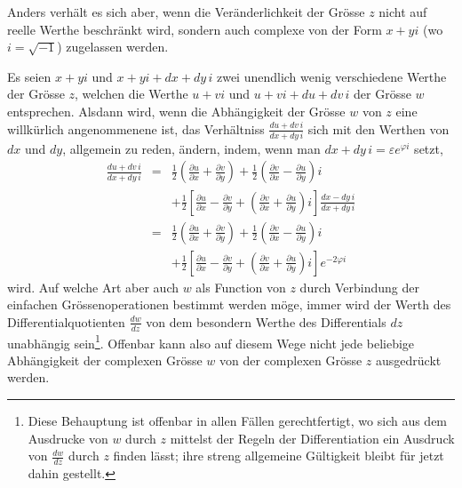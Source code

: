\documentclass[a4paper,12pt]{article}
\begin{document}
Anders verh\"{a}lt es sich aber, wenn die Ver\"{a}nderlichkeit
der Gr\"{o}sse $z$ nicht auf reelle Werthe beschr\"{a}nkt wird,
sondern auch complexe von der Form $x + yi$ (wo $i = \sqrt{-1}$)
zugelassen werden.

Es seien $x + yi$ und $x + yi + dx + dy \, i$ zwei unendlich
wenig verschiedene Werthe der Gr\"{o}sse $z$, welchen die Werthe
$u + vi$ und $u + vi + du + dv \, i$ der Gr\"{o}sse $w$
entsprechen.  Alsdann wird, wenn die Abh\"{a}ngigkeit der
Gr\"{o}sse $w$ von $z$ eine willk\"{u}rlich angenommenene ist,
das Verh\"{a}ltniss
$\displaystyle\frac{du + dv \, i}{dx + dy \, i}$
sich mit den Werthen von $dx$ und $dy$, allgemein zu reden,
\"{a}ndern, indem, wenn man
$dx + dy \, i = \varepsilon e^{\varphi i}$
setzt,
\begin{eqnarray*}
\frac{du + dv \, i}{dx + dy \, i}
   &=&   {\textstyle\frac{1}{2}}
         \left(
            \frac{\partial u}{\partial x}
          + \frac{\partial v}{\partial y}
         \right)
       + {\textstyle\frac{1}{2}}
         \left(
            \frac{\partial v}{\partial x}
          - \frac{\partial u}{\partial y}
         \right) i \\
   & & + {\textstyle\frac{1}{2}}
         \left[
            \frac{\partial u}{\partial x}
          - \frac{\partial v}{\partial y}
          + \left(
               \frac{\partial v}{\partial x}
             + \frac{\partial u}{\partial y}
            \right) i
         \right]
         \frac{dx - dy \, i}{dx + dy \, i} \\
   &=&   {\textstyle\frac{1}{2}}
         \left(
            \frac{\partial u}{\partial x}
          + \frac{\partial v}{\partial y}
         \right)
       + {\textstyle\frac{1}{2}}
         \left(
            \frac{\partial v}{\partial x}
          - \frac{\partial u}{\partial y}
         \right) i \\
   & & + {\textstyle\frac{1}{2}}
         \left[
            \frac{\partial u}{\partial x}
          - \frac{\partial v}{\partial y}
          + \left(
               \frac{\partial v}{\partial x}
             + \frac{\partial u}{\partial y}
            \right) i
         \right]
         e^{-2 \varphi i}
\end{eqnarray*}
wird.  Auf welche Art aber auch $w$ als Function von $z$ durch
Verbindung der einfachen Gr\"{o}ssenoperationen bestimmt werden
m\"{o}ge, immer wird der Werth des Differentialquotienten
$\displaystyle \frac{dw}{dz}$
von dem besondern Werthe des Differentials $dz$ unabh\"{a}ngig
sein\footnote{Diese Behauptung ist offenbar in allen F\"{a}llen
gerechtfertigt, wo sich aus dem Ausdrucke von $w$ durch $z$
mittelst der Regeln der Differentiation ein Ausdruck von
$\displaystyle \frac{dw}{dz}$
durch $z$ finden l\"{a}sst; ihre streng allgemeine G\"{u}ltigkeit
bleibt f\"{u}r jetzt dahin gestellt.}.  Offenbar kann also auf
diesem Wege nicht jede beliebige Abh\"{a}ngigkeit der complexen
Gr\"{o}sse $w$ von der complexen Gr\"{o}sse $z$ ausgedr\"{u}ckt
werden.
\end{document}
